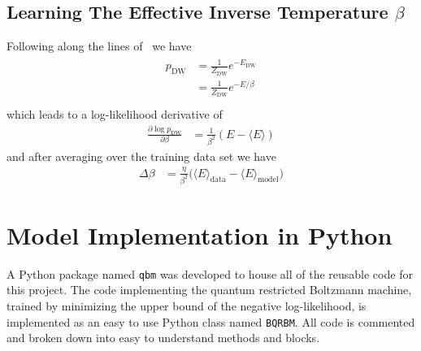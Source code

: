 \subsection{Learning The Effective Inverse Temperature \( \beta \)}\label{app:learning_beta}
Following along the lines of~\cite{xu_2021} we have
\begin{align}
\begin{split}
    p_\text{DW}
        &= \frac{1}{Z_\text{DW}} e^{-E_\text{DW}} \\
        &= \frac{1}{Z_\text{DW}} e^{-E / \beta} \\
\end{split}
\end{align}
which leads to a log-likelihood derivative of
\begin{align}
    \frac{\partial \log p_\text{DW}}{\partial\beta}
        &= \frac{1}{\beta^2} (E - \langle E \rangle)
\end{align}
and after averaging over the training data set we have
\begin{align}
    \Delta\beta
        &= \frac{\eta}{\beta^2}\big(\langle E \rangle_\text{data} - \langle E \rangle_\text{model}\big)
\end{align}

\section{Model Implementation in Python}
A Python package named \texttt{qbm} was developed to house all of the reusable code for this project.
The code implementing the quantum restricted Boltzmann machine, trained by minimizing the upper bound of the negative log-likelihood, is implemented as an easy to use Python class named \texttt{BQRBM}.
All code is commented and broken down into easy to understand methods and blocks.


